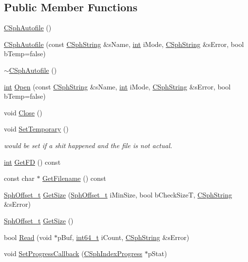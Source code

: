\subsection*{Public Member Functions}
\begin{DoxyCompactItemize}
\item 
\hyperlink{classCSphAutofile_a2c95a115ba0e91b6b536ca19870f5307}{C\-Sph\-Autofile} ()
\item 
\hyperlink{classCSphAutofile_a633f516a7e3ae513cd8b294f57ea7117}{C\-Sph\-Autofile} (const \hyperlink{structCSphString}{C\-Sph\-String} \&s\-Name, \hyperlink{sphinxexpr_8cpp_a4a26e8f9cb8b736e0c4cbf4d16de985e}{int} i\-Mode, \hyperlink{structCSphString}{C\-Sph\-String} \&s\-Error, bool b\-Temp=false)
\item 
\hyperlink{classCSphAutofile_a1fa1f5a2b2117a173aeed3472504503c}{$\sim$\-C\-Sph\-Autofile} ()
\item 
\hyperlink{sphinxexpr_8cpp_a4a26e8f9cb8b736e0c4cbf4d16de985e}{int} \hyperlink{classCSphAutofile_ab06ddeab312b9440ee54ec5839af2965}{Open} (const \hyperlink{structCSphString}{C\-Sph\-String} \&s\-Name, \hyperlink{sphinxexpr_8cpp_a4a26e8f9cb8b736e0c4cbf4d16de985e}{int} i\-Mode, \hyperlink{structCSphString}{C\-Sph\-String} \&s\-Error, bool b\-Temp=false)
\item 
void \hyperlink{classCSphAutofile_af010e09fa8ddae598af8a9b09d104365}{Close} ()
\item 
void \hyperlink{classCSphAutofile_a9d330f328d8aa6631e0c362cb875182c}{Set\-Temporary} ()
\begin{DoxyCompactList}\small\item\em would be set if a shit happened and the file is not actual. \end{DoxyCompactList}\item 
\hyperlink{sphinxexpr_8cpp_a4a26e8f9cb8b736e0c4cbf4d16de985e}{int} \hyperlink{classCSphAutofile_a994e59281c2c01b7ae0b5900ded66ea2}{Get\-F\-D} () const 
\item 
const char $\ast$ \hyperlink{classCSphAutofile_a7eeb1359f3745565003e4b2a2c9db60b}{Get\-Filename} () const 
\item 
\hyperlink{sphinx_8h_a0fb3b64afebef33c61367714754eaa90}{Sph\-Offset\-\_\-t} \hyperlink{classCSphAutofile_a8ddd85e46deccdd1f5bfa88df877d0e5}{Get\-Size} (\hyperlink{sphinx_8h_a0fb3b64afebef33c61367714754eaa90}{Sph\-Offset\-\_\-t} i\-Min\-Size, bool b\-Check\-Size\-T, \hyperlink{structCSphString}{C\-Sph\-String} \&s\-Error)
\item 
\hyperlink{sphinx_8h_a0fb3b64afebef33c61367714754eaa90}{Sph\-Offset\-\_\-t} \hyperlink{classCSphAutofile_af1d617b0dc50cd37019d8b1386e12e61}{Get\-Size} ()
\item 
bool \hyperlink{classCSphAutofile_ac5fcf2a3cb7d5f464b51cb099fde9d40}{Read} (void $\ast$p\-Buf, \hyperlink{sphinxstd_8h_a996e72f71b11a5bb8b3b7b6936b1516d}{int64\-\_\-t} i\-Count, \hyperlink{structCSphString}{C\-Sph\-String} \&s\-Error)
\item 
void \hyperlink{classCSphAutofile_ac5c02b8b7ecfc92f7847aba094427661}{Set\-Progress\-Callback} (\hyperlink{structCSphIndexProgress}{C\-Sph\-Index\-Progress} $\ast$p\-Stat)
\end{DoxyCompactItemize}
